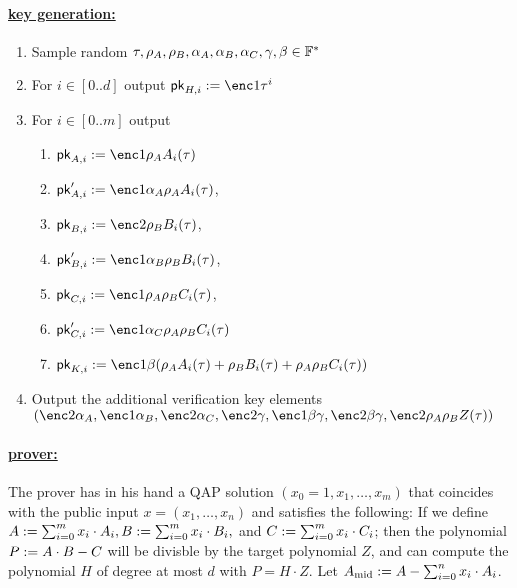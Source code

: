 \documentclass[11pt]{article}
\numberwithin{figure}{section} %
\begin{document}
\paragraph{\underline{\bctv key generation:}}

\begin{enumerate}
 \item Sample random $\tau,\rho_A,\rho_B,\alpha_A,\alpha_B,\alpha_C,\gamma,\beta\in \mathbb F^*$
 \item For $i\in [0..d]$ output $\pk_{H,i}\defeq \enc1{\tau^i}$
 \item For $i\in [0..m]$ output
 
 \begin{enumerate}
  \item $\pk_{A,i}\defeq \enc1{\rho_A A_i(\tau)}$
  
\item  $\pk'_{A,i}\defeq\enc1{\alpha_A\rho_A A_i(\tau)}$,
\item $\pk_{B,i}\defeq\enc2{\rho_B B_i(\tau)}$,
\item $\pk'_{B,i}\defeq \enc1{\alpha_B\rho_B B_i(\tau)}$,
\item $\pk_{C,i}\defeq \enc1{\rho_A\rho_B C_i(\tau)}$,
\item $\pk'_{C,i}\defeq \enc1{\alpha_C \rho_A\rho_B C_i(\tau)}$ 
\item $\pk_{K,i}\defeq \enc1{\beta (\rho_A A_i(\tau) + \rho_B B_i(\tau) + \rho_A\rho_B C_i(\tau))}$ 

\end{enumerate}
\item Output the additional verification key elements $(\enc2{\alpha_A},\enc1{\alpha_B},\enc2{\alpha_C},\enc2{\gamma},\enc1{\beta\gamma},\enc2{\beta\gamma},\enc2{\rho_A\rho_B Z(\tau)})$
 \end{enumerate}

\newcommand{\Amid}{\ensuremath{A_{\mathrm{mid}}}\xspace}
\paragraph{\underline{\bctv prover:}\\}
The prover has in his hand a QAP solution $(x_0=1,x_1,\ldots,x_m)$ that coincides with the public input $x=(x_1,\ldots,x_n)$ and satisfies the following:
If we define $A:= \sum_{i=0}^m x_i\cdot A_i, B:= \sum_{i=0}^m x_i \cdot B_i,$ and $C:= \sum_{i=0}^m x_i \cdot C_i$;
then the polynomial $P:= A\cdot B - C$ will be divisble by the target polynomial $Z$, and \per can compute the polynomial $H$ of degree at most $d$ with $P=H\cdot Z$. Let $\Amid\defeq A -\sum_{i=0}^n x_i\cdot A_i$.
\end{document}
